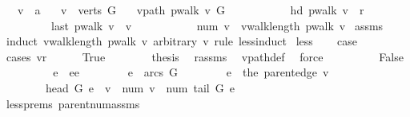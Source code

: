 \begin{isabellebody}
\ \ \ v\ {\isacharcolon}{\isacharcolon}\ {\isacharprime}a\isanewline
\ \ \ {\isachardoublequoteopen}v\ {\isasymin}\ verts\ G{\isachardoublequoteclose}\isanewline
\ \ \ {\isachardoublequoteopen}vpath\ {\isacharparenleft}pwalk\ v{\isacharparenright}\ G\ {\isasymand}\ \isanewline
\ \ \ \ \ \ \ \ \ hd\ {\isacharparenleft}pwalk\ v{\isacharparenright}\ {\isacharequal}\ r\ {\isasymand}\ \isanewline
\ \ \ \ \ \ \ \ \ last\ {\isacharparenleft}pwalk\ v{\isacharparenright}\ {\isacharequal}\ v\ {\isasymand}\ \isanewline
\ \ \ \ \ \ \ \ \ num\ v\ {\isacharequal}\ vwalk{\isacharunderscore}length\ {\isacharparenleft}pwalk\ v{\isacharparenright}{\isachardoublequoteclose}\isanewline
%
\isadelimproof
%
\endisadelimproof
%
\isatagproof
{}\isamarkupfalse%
\ assms\isanewline
{}\isamarkupfalse%
\ {\isacharparenleft}induct\ {\isachardoublequoteopen}vwalk{\isacharunderscore}length\ {\isacharparenleft}pwalk\ v{\isacharparenright}{\isachardoublequoteclose}\ arbitrary{\isacharcolon}\ v\ rule{\isacharcolon}\ less{\isacharunderscore}induct{\isacharparenright}\isanewline
{}\isamarkupfalse%
\ less\isanewline
\ \ \isamarkupfalse%
\ {\isacharquery}case\isanewline
\ \ \isamarkupfalse%
\ {\isacharparenleft}cases\ {\isachardoublequoteopen}v{\isacharequal}r{\isachardoublequoteclose}{\isacharparenright}\isanewline
\ \ \ \ \isamarkupfalse%
\ True\isanewline
\ \ \ \ \ \ \isamarkupfalse%
\ {\isacharquery}thesis\ \isamarkupfalse%
\ r{\isacharunderscore}assms\ \isamarkupfalse%
\ vpath{\isacharunderscore}def\ \isamarkupfalse%
\ force\ \isanewline
\ \ \isamarkupfalse%
\isanewline
\ \ \ \ \isamarkupfalse%
\ False\isanewline
\ \ \ \ \ \ \isamarkupfalse%
\ \isamarkupfalse%
\ e\ \ ee{\isacharcolon}\isanewline
\ \ \ \ \ \ \ \ {\isachardoublequoteopen}e\ {\isasymin}\ arcs\ G{\isachardoublequoteclose}\isanewline
\ \ \ \ \ \ \ \ {\isachardoublequoteopen}e\ {\isacharequal}\ the\ {\isacharparenleft}parent{\isacharunderscore}edge\ v{\isacharparenright}{\isachardoublequoteclose}\isanewline
\ \ \ \ \ \ \ \ {\isachardoublequoteopen}head\ G\ e\ {\isacharequal}\ v\ {\isasymand}\ num\ v\ {\isacharequal}\ num\ {\isacharparenleft}tail\ G\ e{\isacharparenright}\ {\isacharplus}\ {}{\isachardoublequoteclose}\ \ \isanewline
\ \ \ \ \ \ \ \ \isamarkupfalse%
\ less{\isachardot}prems\ parent{\isacharunderscore}num{\isacharunderscore}assms\ \isamarkupfalse%

\end{isabellebody}
